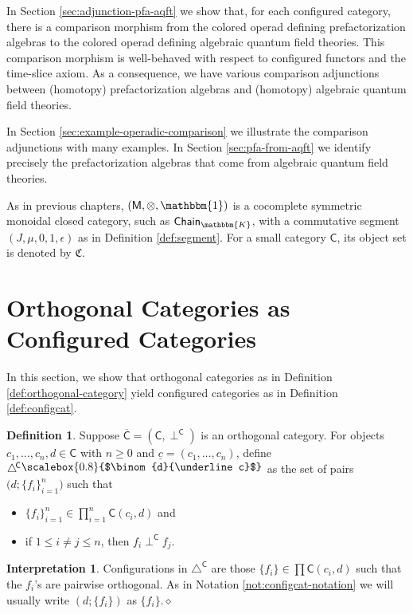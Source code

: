 \documentclass{amsbook}
\numberwithin{section}{chapter}
\numberwithin{subsection}{section}
\numberwithin{equation}{section}
\theoremstyle{plain}
\theoremstyle{definition}
\newtheorem{definition}[equation]{Definition}
\newtheorem{interpretation}[equation]{Interpretation}
\newcommand{\fieldk}{\mathbbm{K}}
\newcommand{\colorc}{\mathfrak{C}}
\newcommand{\C}{\mathsf{C}}
\newcommand{\M}{\mathsf{M}}
\newcommand{\tensorunit}{\mathbbm{1}}
\newcommand{\dqed}{\hfill$\diamond$}
\newcommand{\Config}{\triangle} %
\newcommand{\Configc}{\Config^{\!\C}}
\newcommand{\perpc}{\perp^{\C}}
\newcommand{\Cbar}{\overline{\C}}
\newcommand{\Chaink}{\mathsf{Chain}_{\fieldk}}
\newcommand{\uc}{\underline c}
\newcommand{\smallprof}[1]
{\raisebox{.05cm}{\scalebox{0.8}{#1}}}
\newcommand{\duc}{\smallprof{$\binom{d}{\uc}$}}
\begin{document}
In Section \ref{sec:adjunction-pfa-aqft} we show that, for each configured category, there is a comparison morphism from the colored operad defining prefactorization algebras to the colored operad defining algebraic quantum field theories.  This comparison morphism is well-behaved with respect to configured functors and the time-slice axiom.  As a consequence, we have various comparison adjunctions between (homotopy) prefactorization algebras and (homotopy) algebraic quantum field theories.

In Section \ref{sec:example-operadic-comparison} we illustrate the comparison adjunctions with many examples.  In Section \ref{sec:pfa-from-aqft} we identify precisely the prefactorization algebras that come from algebraic quantum field theories.

As in previous chapters, $(\M,\otimes,\tensorunit)$ is a cocomplete symmetric monoidal closed category, such as $\Chaink$, with a commutative segment $(J,\mu,0,1,\epsilon)$ as in Definition \ref{def:segment}.  For a small category $\C$, its object set is denoted by $\colorc$.


\section{Orthogonal Categories as Configured Categories}\label{sec:relation-orthcat}

In this section, we show that orthogonal categories as in Definition \ref{def:orthogonal-category} yield configured categories as in Definition \ref{def:configcat}.

\begin{definition}\label{def:orthcat-to-confcat}
Suppose $\Cbar = (\C,\perpc)$ is an orthogonal category.  For objects $c_1,\ldots,c_n,d\in \C$ with $n \geq 0$ and $\uc = (c_1,\ldots,c_n)$, define $\Configc\duc$ as the set of pairs $\bigl(d;\{f_i\}_{i=1}^n\bigr)$ such that
\begin{itemize}\item $\{f_i\}_{i=1}^n \in \prod_{i=1}^n \C(c_i,d)$ and
\item if $1 \leq i \not=j \leq n$, then $f_i \perpc f_j$.
\end{itemize}
\end{definition}

\begin{interpretation} Configurations in $\Configc$ are those $\{f_i\} \in \prod\C(c_i,d)$ such that the $f_i$'s are pairwise orthogonal.  As in Notation \ref{not:configcat-notation} we will usually write $(d;\{f_i\})$ as $\{f_i\}$.\dqed\end{interpretation}
\end{document}
